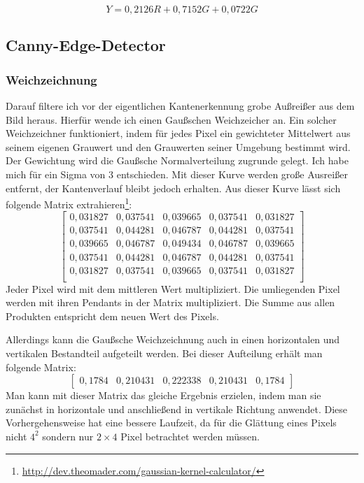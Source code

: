 \begin{equation}
Y = 0,2126R+0,7152G+0,0722G
\end{equation}

\subsection{Canny-Edge-Detector}
\subsubsection{Weichzeichnung}
Darauf filtere ich vor der eigentlichen Kantenerkennung grobe Außreißer aus dem Bild heraus. Hierfür wende ich einen Gaußschen Weichzeicher an. Ein solcher Weichzeichner funktioniert, indem für jedes Pixel ein gewichteter Mittelwert aus seinem eigenen Grauwert und den Grauwerten seiner Umgebung bestimmt wird. Der Gewichtung wird die Gaußsche Normalverteilung zugrunde gelegt. Ich habe mich für ein Sigma von 3 entschieden. Mit dieser Kurve werden große Ausreißer entfernt, der Kantenverlauf bleibt jedoch erhalten. Aus dieser Kurve lässt sich folgende Matrix extrahieren\footnote{\url{http://dev.theomader.com/gaussian-kernel-calculator/}}:
\begin{equation}
	\begin{bmatrix}
	0,031827&0,037541&0,039665&0,037541&0,031827 \\
	0,037541&0,044281&0,046787&0,044281&0,037541 \\
	0,039665&0,046787&0,049434&0,046787&0,039665 \\
	0,037541&0,044281&0,046787&0,044281&0,037541 \\
	0,031827&0,037541&0,039665&0,037541&0,031827 \\
	\end{bmatrix}
\end{equation}
Jeder Pixel wird mit dem mittleren Wert multipliziert. Die umliegenden Pixel werden mit ihren Pendants in der Matrix multipliziert. Die Summe aus allen Produkten entspricht dem neuen Wert des Pixels.

Allerdings kann die Gaußsche Weichzeichnung auch in einen horizontalen und vertikalen Bestandteil aufgeteilt werden. Bei dieser Aufteilung erhält man folgende Matrix:
\begin{equation}
	\begin{bmatrix}
	0,1784&0,210431&0,222338&0,210431&0,1784
	\end{bmatrix}
\end{equation}
Man kann mit dieser Matrix das gleiche Ergebnis erzielen, indem man sie zunächst in horizontale und anschließend in vertikale Richtung anwendet. Diese Vorhergehensweise hat eine bessere Laufzeit, da für die Glättung eines Pixels nicht \(4^2\) sondern nur \(2\times 4\) Pixel betrachtet werden müssen.

